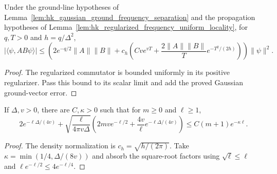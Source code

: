 \begin{lemma}
    \label{lem:hk_gaussian_ordinary_centered_correlation}
    \leanok
    Under the ground-line hypotheses of Lemma~\ref{lem:hk_gaussian_ground_frequency_separation}
    and the propagation hypotheses of Lemma~\ref{lem:hk_regularized_frequency_uniform_locality}, for
    $q,T>0$ and $h=q/\Delta^2$,
    \[
        |\langle\psi,AB\psi\rangle|
        \le\left(2e^{-q/2}\|A\|\|B\|
        +c_h\left(Cve^{vT}
            +\frac{2\|A\|\|B\|}{T}e^{-T^2/(2h)}\right)\right)\|\psi\|^2.
    \]
\end{lemma}
\begin{proof}\leanok
    The regularized commutator is bounded uniformly in its positive
    regularizer. Pass this bound to its scalar limit and add the proved
    Gaussian ground-vector error.
\end{proof}

\begin{lemma}
    \label{lem:hk_gaussian_frequency_clustering_rate}
    \leanok
    If $\Delta,v>0$, there are $C,\kappa>0$ such that for $m\ge0$ and
    $\ell\ge1$,
    \[
        2e^{-\ell\Delta/(4v)}+
        \sqrt{\frac{\ell}{4\pi v\Delta}}
        \left(2mv e^{-\ell/2}
        +\frac{4v}{\ell}e^{-\ell\Delta/(4v)}\right)
        \le C(m+1)e^{-\kappa\ell}.
    \]
\end{lemma}
\begin{proof}\leanok
    The density normalization is $c_h=\sqrt{h/(2\pi)}$.
    Take $\kappa=\min(1/4,\Delta/(8v))$ and absorb the square-root
    factors using $\sqrt\ell\le\ell$ and
    $\ell e^{-\ell/2}\le4e^{-\ell/4}$.
\end{proof}
